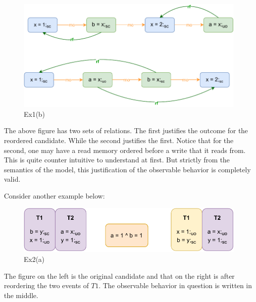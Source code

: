         \begin{figure}[H]
            \centering
            \includegraphics[scale=0.7]{5.InstructionReordering/0.Intro/ReorderingExample1(b).pdf}
            \caption{Ex1(b)} 
        \end{figure}

        The above figure has two sets of relations. The first justifies the outcome for the reordered candidate. While the second justifies the first. 
        Notice that for the second, one may have a read memory ordered before a write that it reads from. 
        This is quite counter intuitive to understand at first. 
        But strictly from the semantics of the model, this justification of the observable behavior is completely valid. 

        Consider another example below:

        \begin{figure}[H]
            \centering
            \includegraphics[scale=0.7]{5.InstructionReordering/0.Intro/ReorderingExample2(a).pdf}
            \caption{Ex2(a)} 
        \end{figure}

        The figure on the left is the original candidate and that on the right is after reordering the two events of $T1$.
        The observable behavior in question is written in the middle. 


